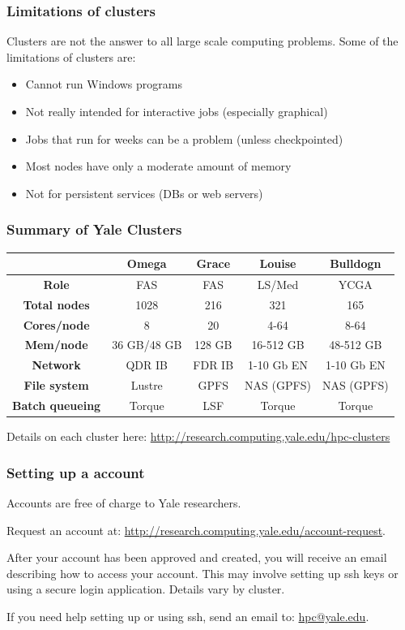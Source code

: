 \documentclass[10pt]{beamer}
\begin{document}
\begin{frame}
\frametitle{Limitations of clusters}
Clusters are not the answer to all large scale computing problems.
Some of the limitations of clusters are:

\begin{itemize}
\item Cannot run Windows programs
\item Not really intended for interactive jobs (especially graphical)
\item Jobs that run for weeks can be a problem (unless checkpointed)
\item Most nodes have only a moderate amount of memory
\item Not for persistent services (DBs or web servers)
\end{itemize}
\end{frame}

\begin{frame}[fragile]
\frametitle{Summary of Yale Clusters}
\begin{tabular}{|c|c|c|c|c|}
\hline
& \textbf{Omega} & \textbf{Grace}& \textbf{Louise} & \textbf{Bulldogn} \\
\hline
\textbf{Role} & FAS & FAS & LS/Med & YCGA  \\
\hline
\textbf{Total nodes} & 1028 & 216 & 321 & 165  \\
\hline
\textbf{Cores/node} & 8 & 20 & 4-64 & 8-64 \\
\hline
\textbf{Mem/node} & 36 GB/48 GB & 128 GB & 16-512 GB & 48-512 GB  \\
\hline
\textbf{Network} & QDR IB & FDR IB& 1-10 Gb EN & 1-10 Gb EN  \\
\hline
\textbf{File system} & Lustre & GPFS & NAS (GPFS) & NAS (GPFS) \\
\hline
\textbf{Batch queueing} & Torque & LSF & Torque & Torque \\
\hline
\end{tabular}

\vskip10pt

Details on each cluster here:
\url{http://research.computing.yale.edu/hpc-clusters}

\end{frame}

\begin{frame}[fragile]
\frametitle{Setting up a account}

Accounts are free of charge to Yale researchers.
\vskip10pt

Request an account at: \url{http://research.computing.yale.edu/account-request}.

\vskip10pt
After your account has been approved and created, you will receive
an email describing how to access your account.  This may involve setting up ssh keys or 
using a secure login application.  Details vary by cluster.

\vskip10pt
If you need help setting up or using ssh, send an email to: \url{hpc@yale.edu}.
\end{frame}
\end{document}

